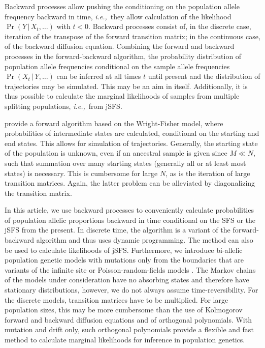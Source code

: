 \documentclass[preprint]{elsarticle}
\newcommand\given{{\,|\,}}
\newcommand\ie{{\it i.e.,}}
\begin{document}
Backward processes allow pushing the conditioning on the population allele frequency backward in time, \ie\ they allow calculation of the likelihood $\Pr(Y\given X_t, \dots)$ with $t<0$. Backward processes consist of, in the discrete case, iteration of the transpose of the forward transition matrix; in the continuous case, of the backward diffusion equation. Combining the forward and backward processes in the forward-backward algorithm, the probability distribution of population allele frequencies conditional on the sample allele frequencies $\Pr(X_t\given Y,\dots)$ can be inferred at all times $t$ until present and the distribution of trajectories may be simulated. This may be an aim in itself. Additionally, it is thus possible to calculate the marginal likelihoods of samples from multiple splitting populations, \ie\ from jSFS.

\citet{Zhao13} provide a forward algorithm based on the Wright-Fisher model, where probabilities of intermediate states are calculated, conditional on the starting and end states. This allows for simulation of trajectories. Generally, the starting state of the population is unknown, even if an ancestral sample is given since $M \ll N$, such that summation over many starting states (generally all or at least most states) is necessary. This is cumbersome for large $N$, as is the iteration of large transition matrices. Again, the latter problem can be alleviated by diagonalizing the transition matrix. 

In this article, we use backward processes to conveniently calculate probabilities of population allelic proportions backward in time conditional on the SFS or the jSFS from the present. In discrete time, the algorithm is a variant of the forward-backward algorithm and thus uses dynamic programming. The method can also be used to calculate likelihoods of jSFS. Furthermore, we introduce bi-allelic population genetic models with mutations only from the boundaries that are variants of the infinite site or Poisson-random-fields models \citep{Kimu69,Sawy92}. The Markov chains of the models under consideration have no absorbing states and therefore have stationary distributions, however, we do not always assume time-reversibility. For the discrete models, transition matrices have to be multiplied. For large population sizes, this may be more cumbersome than the use of Kolmogorov forward and backward diffusion equations and of orthogonal polynomials. With mutation and drift only, such orthogonal polynomials provide a flexible and fast method to calculate marginal likelihoods for inference in population genetics.
\end{document}
